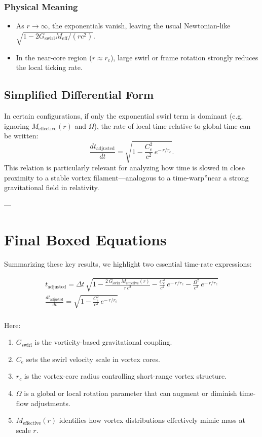 \subsubsection{Physical Meaning}
\begin{itemize}
    \item As \(r \to \infty\), the exponentials vanish, leaving the usual Newtonian-like \(\sqrt{1 - 2G_\text{swirl} M_\text{eff} / (rc^2)}\).
    \item In the near-core region (\(r \approx r_c\)), large swirl or frame rotation strongly reduces the local ticking rate.
\end{itemize}

\subsection{Simplified Differential Form}
In certain configurations, if only the exponential swirl term is dominant (e.g. ignoring \(M_\text{effective}(r)\) and \(\Omega\)), the rate of local time relative to global time can be written:
\[
    \frac{d t_\text{adjusted}}{d t}    =    \sqrt{1 - \frac{C_e^2}{c^2}\, e^{-\,r/r_c}}.
\]
This relation is particularly relevant for analyzing how time is slowed in close proximity to a stable vortex filament—analogous to a \grqq time-warp\textquotedblright near a strong gravitational field in relativity.

---

\section{Final Boxed Equations}

Summarizing these key results, we highlight two essential time-rate expressions:

\begin{gather*}
    \boxed{
        t_\text{adjusted} = \Delta t \,\sqrt{
            1 - \frac{2\,G_\text{swirl}\,M_\text{effective}(r)}{r\,c^2} - \frac{C_e^2}{c^2}\, e^{-\,r/r_c} - \frac{\Omega^2}{c^2}\, e^{-\,r/r_c}
        }
    }\\
    \boxed{
        \frac{d t_\text{adjusted}}{d t} = \sqrt{1 - \frac{C_e^2}{c^2}\, e^{-\,r/r_c}}
    }\\
\end{gather*}

Here:
\begin{enumerate}
    \item \(G_\text{swirl}\) is the vorticity-based gravitational coupling.
    \item \(C_e\) sets the swirl velocity scale in vortex cores.
    \item \(r_c\) is the vortex-core radius controlling short-range vortex structure.
    \item \(\Omega\) is a global or local rotation parameter that can augment or diminish time-flow adjustments.
    \item \(M_\text{effective}(r)\) identifies how vortex distributions effectively mimic mass at scale \(r\).
\end{enumerate}


